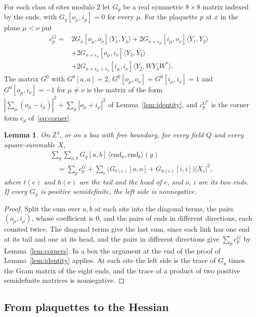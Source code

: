 \documentclass[aps,prd,twocolumn,superscriptaddress,nofootinbib,longbibliography,floatfix,amsmath,amssymb,10pt]{revtex4-2}
\newtheorem{lemma}[theorem]{Lemma}
\theoremstyle{definition}
\theoremstyle{remark}
\newcommand{\Z}{\mathbb{Z}}
\newcommand{\ip}[2]{\langle #1,#2\rangle}
\begin{document}
For each class of sites modulo $2$ let $G_y$ be a real symmetric $8\times8$
matrix indexed by the ends, with $G_y[o_\mu,i_\mu]=0$ for every $\mu$. For
the plaquette $p$ at $x$ in the plane $\mu<\nu$ put
\[
\begin{split}
c^G_p={}&2G_x[o_\mu,o_\nu]\ip{Y_1}{Y_4}
+2G_{x+e_\mu}[i_\mu,o_\nu]\ip{Y_1}{Y_2}\\
&+2G_{x+e_\nu}[o_\mu,i_\nu]\ip{Y_3}{Y_4}\\
&+2G_{x+e_\mu+e_\nu}[i_\mu,i_\nu]\ip{Y_2}{WY_3W^*}.
\end{split}
\]
The matrix $G^0$ with $G^0[a,a]=2$, $G^0[o_\mu,o_\nu]=G^0[i_\mu,i_\nu]=1$
and $G^0[o_\mu,i_\nu]=-1$ for $\mu\ne\nu$ is the matrix of the form
$|\sum_\mu(o_\mu-i_\mu)|^2+\sum_\mu|o_\mu+i_\mu|^2$ of
Lemma~\ref{lem:identity}, and $c^{G^0}_p$ is the corner form
$c_p$ of~\eqref{eq:corner}.

\begin{lemma}\label{lem:siteidentity}
On $\Z^4$, or on a box with free boundary, for every field $Q$ and every
square-summable $X$,
\[
\begin{split}
&\sum_y\sum_{a,b}G_y[a,b]\,\ip{\mathrm{end}_a}{\mathrm{end}_b}(y)\\
&\quad=\sum_pc^G_p+\sum_e\bigl(G_{t(e)}[o,o]+G_{h(e)}[i,i]\bigr)|X_e|^2,
\end{split}
\]
where $t(e)$ and $h(e)$ are the tail and the head of $e$, and $o$, $i$ are
its two ends. If every $G_y$ is positive semidefinite, the left side is
nonnegative.
\end{lemma}

\begin{proof}
Split the sum over $a,b$ at each site into the diagonal terms, the pairs
$(o_\mu,i_\mu)$, whose coefficient is $0$, and the pairs of ends in
different directions, each counted twice. The diagonal terms give the last
sum, since each link has one end at its tail and one at its head, and the
pairs in different directions give $\sum_pc^G_p$ by
Lemma~\ref{lem:corners}. In a box the argument at the end of the proof of
Lemma~\ref{lem:identity} applies. At each site the left side is the trace of
$G_y$ times the Gram matrix of the eight ends, and the trace of a product of
two positive semidefinite matrices is nonnegative.
\end{proof}

\subsection{From plaquettes to the Hessian}
\end{document}
